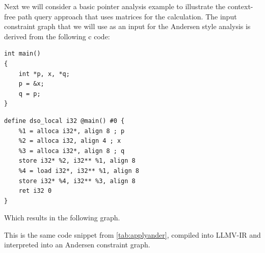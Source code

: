 Next we will consider a basic pointer analysis example to illustrate the context-free path query approach that uses matrices for the calculation.
The input constraint graph that we will use as an input for the Andersen style analysis is derived from the following c code:

\begin{center}
    \begin{minipage}[t]{0.3\textwidth}
        \begin{verbatim}
int main()
{
    int *p, x, *q;
    p = &x;
    q = p;
}
        \end{verbatim}
    \end{minipage}
    \begin{minipage}[t]{0.6\textwidth}
        \begin{verbatim}
define dso_local i32 @main() #0 {
    %1 = alloca i32*, align 8 ; p
    %2 = alloca i32, align 4 ; x
    %3 = alloca i32*, align 8 ; q
    store i32* %2, i32** %1, align 8
    %4 = load i32*, i32** %1, align 8
    store i32* %4, i32** %3, align 8
    ret i32 0
}
        \end{verbatim}
    \end{minipage}
\end{center}
Which results in the following graph.
\begin{center}
\end{center}
This is the same code snippet from \autoref{tab:applyander}, compiled into LLMV-IR and interpreted into an Andersen constraint graph.

